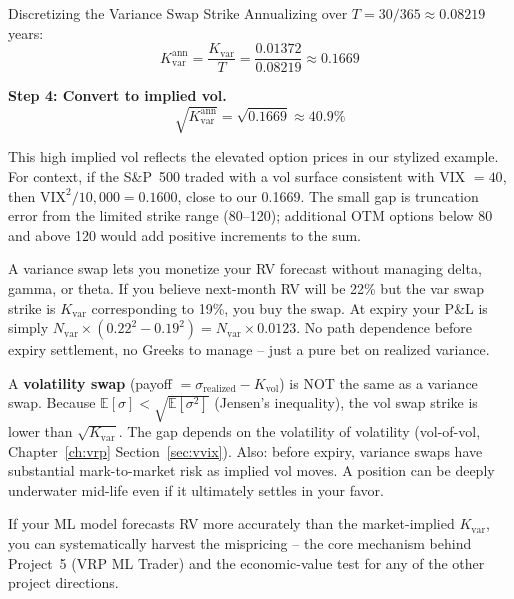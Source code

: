 \begin{workedexample}{Discretizing the Variance Swap Strike}
Annualizing over $T = 30/365 \approx 0.08219$ years:
\[
  K_{\text{var}}^{\text{ann}} = \frac{K_{\text{var}}}{T} = \frac{0.01372}{0.08219} \approx 0.1669
\]

\textbf{Step 4: Convert to implied vol.}
\[
  \sqrt{K_{\text{var}}^{\text{ann}}} = \sqrt{0.1669} \approx 40.9\%
\]

This high implied vol reflects the elevated option prices in our stylized example.
For context, if the S\&P~500 traded with a vol surface consistent with VIX $= 40$, then $\text{VIX}^2/10{,}000 = 0.1600$, close to our 0.1669.
The small gap is truncation error from the limited strike range (80--120); additional OTM options below 80 and above 120 would add positive increments to the sum.
\end{workedexample}

\begin{intuition}
A variance swap lets you monetize your RV forecast without managing delta, gamma, or theta.
If you believe next-month RV will be 22\% but the var swap strike is $K_{\text{var}}$ corresponding to 19\%, you buy the swap.
At expiry your P\&L is simply $N_{\text{var}} \times (0.22^2 - 0.19^2) = N_{\text{var}} \times 0.0123$.
No path dependence before expiry settlement, no Greeks to manage -- just a pure bet on realized variance.
\end{intuition}

\begin{warning}
A \textbf{volatility swap} (payoff $= \sigma_{\text{realized}} - K_{\text{vol}}$) is NOT the same as a variance swap.
Because $\mathbb{E}[\sigma] < \sqrt{\mathbb{E}[\sigma^2]}$ (Jensen's inequality), the vol swap strike is lower than $\sqrt{K_{\text{var}}}$.
The gap depends on the volatility of volatility (vol-of-vol, Chapter~\ref{ch:vrp} Section~\ref{sec:vvix}).
Also: before expiry, variance swaps have substantial mark-to-market risk as implied vol moves.
A position can be deeply underwater mid-life even if it ultimately settles in your favor.
\end{warning}

\begin{projectconnection}
If your ML model forecasts RV more accurately than the market-implied $K_{\text{var}}$, you can systematically harvest the mispricing -- the core mechanism behind Project~5 (VRP ML Trader) and the economic-value test for any of the other project directions.
\end{projectconnection}


